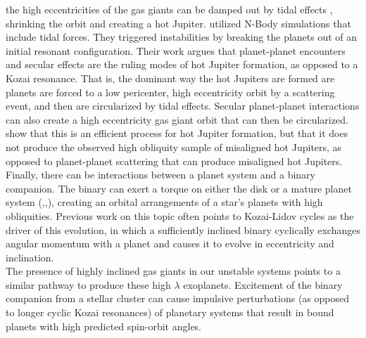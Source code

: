 \documentclass{aastex631}
\begin{document}
the high eccentricities of the gas giants can be damped out by tidal effects \citep{nag08}, shrinking the orbit and creating a hot Jupiter. \cite{bea12} utilized N-Body 
simulations that include tidal forces. They triggered instabilities by breaking the planets out of an initial resonant configuration.
 Their work argues that planet-planet encounters and secular effects are the ruling modes of hot Jupiter formation, as opposed to a Kozai resonance. That is,
 the dominant way the hot Jupiters are formed are planets are forced to a low pericenter, high eccentricity orbit by a scattering event, and then are circularized
 by tidal effects. Secular planet-planet interactions can also create a high eccentricity gas giant orbit that can then be circularized. \cite{pet15b} show that this is an 
 efficient process for hot Jupiter formation, but that it does not produce the observed high obliquity sample of misaligned hot Jupiters, as opposed to planet-planet
 scattering that can produce misaligned hot Jupiters. \\ 
\indent Finally, there can be interactions between a planet system and a binary companion.
The binary can exert a torque on either the disk \citep{bat12} or a mature planet system (\cite{fab07},\cite{kai11},\cite{dro20}), creating an 
orbital arrangements of a star's planets with high obliquities. Previous work \citep{wu03,wu07,fab07} on this topic often points to Kozai-Lidov cycles as the driver of this evolution, 
in which
a sufficiently inclined binary cyclically exchanges angular momentum with a planet and causes it to evolve in eccentricity and inclination. \\
The presence of highly inclined gas giants in our unstable systems
points to a similar pathway to produce these high $\lambda$ exoplanets. Excitement of the binary companion from a stellar cluster
can cause impulsive perturbations (as opposed to longer cyclic Kozai resonances) of planetary systems that result in bound planets with 
high predicted spin-orbit angles.
\end{document}
